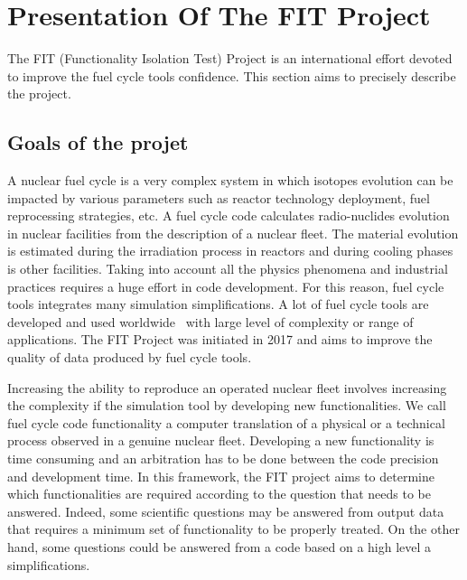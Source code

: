 \section{Presentation Of The FIT Project}

The FIT (Functionality Isolation Test) Project is an international effort devoted to improve the fuel cycle tools confidence. This section aims to precisely describe the project.


\subsection{Goals of the projet}

A nuclear fuel cycle is a very complex system in which isotopes evolution can be impacted by various parameters such as reactor technology deployment, fuel reprocessing strategies, etc. A fuel cycle code calculates radio-nuclides evolution in nuclear facilities from the description of a nuclear fleet. The material evolution is estimated during the irradiation process in reactors and during cooling phases is other facilities. Taking into account all the physics phenomena and industrial practices requires a huge effort in code development. For this reason, fuel cycle tools integrates many simulation simplifications. A lot of fuel cycle tools are developed and used worldwide~\cite{COSI6_2015, VanDenDurpel2015, Huff2016} with large level of complexity or range of applications. The FIT Project was initiated in 2017 and aims to improve the quality of data produced by fuel cycle tools. 

Increasing the ability to reproduce an operated nuclear fleet involves increasing the complexity if the simulation tool by developing new functionalities. We call fuel cycle code functionality a computer translation of a physical or a technical process observed in a genuine nuclear fleet. Developing a new functionality is time consuming and an arbitration has to be done between the code precision and development time. In this framework, the FIT project aims to determine which functionalities are required according to the question that needs to be answered. Indeed, some scientific questions may be answered from output data that requires a minimum set of functionality to be properly treated. On the other hand, some questions could be answered from a code based on a high level a simplifications. 

